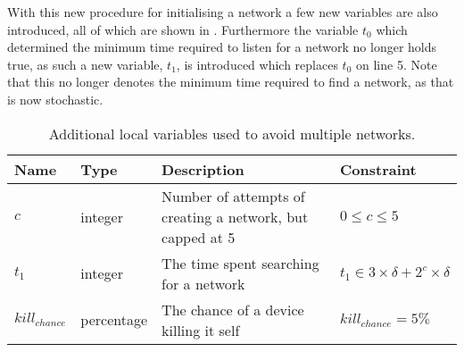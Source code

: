 \bigskip \noindent
With this new procedure for initialising a network a few new variables are also introduced, all of which are shown in .
Furthermore the variable $t_0$ which determined the minimum time required to listen for a network no longer holds true, as such a new variable, $t_1$, is introduced which replaces $t_0$ on  line 5.
Note that this no longer denotes the minimum time required to find a network, as that is now stochastic.
\begin{table}[h]
    {\setlength{\extrarowheight}{1ex}%
    \begin{tabularx}{\textwidth}{l|l|X|l}
        \toprule
        Name                & Type       & Description & Constraint \\
        \midrule
        $c$                 & integer    & Number of attempts of creating a network, but capped at 5                         & $0 \leq c \leq 5$     \\
        $t_1$               & integer    & The time spent searching for a network                                            & $t_1 \in 3 \times \delta + 2^c \times \delta$     \\
        $kill_{chance}$     & percentage & The chance of a device killing it self                                            & $kill_{chance} = 5\%$  \\
        \bottomrule
    \end{tabularx}}
    \caption{Additional local variables used to avoid multiple networks.}
    \label{tab:locals_wmultistartup}
\end{table}
